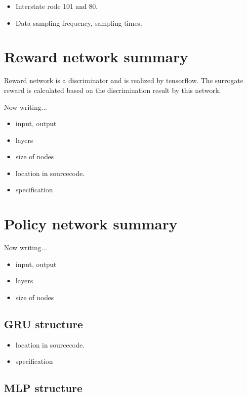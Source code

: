 \begin{itemize}
\item Interstate rode 101 and 80.
\item Data sampling frequency, sampling times.
\end{itemize}


\section{Reward network summary}

Reward network is a discriminator and is realized by tensorflow. The surrogate reward is calculated based on the discrimination result by this network.


Now writing...
\begin{itemize}
\item input, output
\item layers
\item size of nodes
\end{itemize}

\begin{itemize}
\item location in sourcecode.
\item specification
\end{itemize}


\section{Policy network summary}

Now writing...

\begin{itemize}
\item input, output
\item layers
\item size of nodes
\end{itemize}

\subsection{GRU structure}

\begin{itemize}
\item location in sourcecode.
\item specification
\end{itemize}

\subsection{MLP structure}


